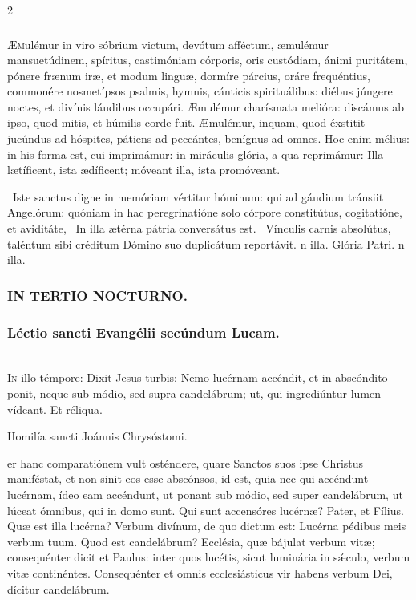\documentclass[9pt,twoside]{extarticle}
\begin{document}
\begin{multicols}{2}
\subsubsection*{\center{}}
\lettrine{Æ}mulémur in viro sóbrium victum, devótum afféctum, æmulémur mansuetúdinem, spíritus, castimóniam córporis, oris custódiam, ánimi puritátem, pónere frænum iræ, et modum linguæ, dormíre párcius, oráre frequéntius, commonére nosmetípsos psalmis, hymnis, cánticis spirituálibus: diébus júngere noctes, et divínis láudibus occupári. Æmulémur charísmata melióra: discámus ab ipso, quod mitis, et húmilis corde fuit. Æmulémur, inquam, quod éxstitit jucúndus ad hóspites, pátiens ad peccántes, benígnus ad omnes. Hoc enim mélius: in his forma est, cui imprimámur: in miráculis glória, a qua reprimámur: Illa lætíficent, ista ædíficent; móveant illa, ista promóveant.

\begin{tightlist}{}
\item {}~Iste sanctus digne in memóriam vértitur hóminum: qui ad gáudium tránsiit Angelórum: quóniam in hac peregrinatióne solo córpore constitútus, cogitatióne, et aviditáte, \textred{*}~In illa ætérna pátria conversátus est. ~Vínculis carnis absolútus, taléntum sibi créditum Dómino suo duplicátum reportávit. n illa. Glória Patri. n illa.
\end{tightlist}

\subsubsection*{\center \textsc{IN TERTIO NOCTURNO.}}
\subsubsection*{\center Léctio sancti Evangélii secúndum Lucam.}
\\

\lettrine{I}n illo témpore: Dixit Jesus turbis: Nemo lucérnam accéndit, et in abscóndito ponit, neque sub módio, sed supra candelábrum; ut, qui ingrediúntur lumen vídeant. Et réliqua.

\begin{center}Homilía sancti Joánnis Chrysóstomi.\\
\end{center}

er hanc comparatiónem vult osténdere, quare Sanctos suos ipse Christus maniféstat, et non sinit eos esse abscónsos, id est, quia nec qui accéndunt lucérnam, ídeo eam accéndunt, ut ponant sub módio, sed super candelábrum, ut lúceat ómnibus, qui in domo sunt. Qui sunt accensóres lucérnæ? Pater, et Fílius. Quæ est illa lucérna? Verbum divínum, de quo dictum est: Lucérna pédibus meis verbum tuum. Quod est candelábrum? Ecclésia, quæ bájulat verbum vitæ; consequénter dicit et Paulus: inter quos lucétis, sicut luminária in sǽculo, verbum vitæ continéntes. Consequénter et omnis ecclesiásticus vir habens verbum Dei, dícitur candelábrum.


\end{multicols}
\end{document}

